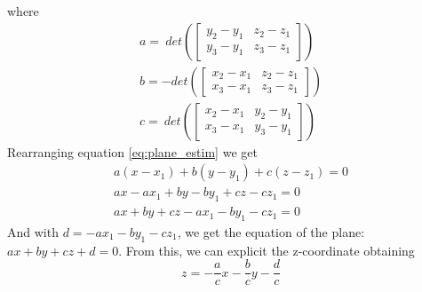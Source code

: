 where
\begin{equation}
    \label{eq:plane_coefficients}
    \begin{gathered}
        a = \ det \left (\begin{bmatrix}
            y_2 - y_1 & z_2 - z_1 \\
            y_3 - y_1 & z_3 - z_1 
        \end{bmatrix} \right ) \\
        b = - det \left (\begin{bmatrix}
            x_2 - x_1 & z_2 - z_1 \\
            x_3 - x_1 & z_3 - z_1
        \end{bmatrix} \right ) \\
        c = \ det \left (\begin{bmatrix}
            x_2 - x_1 & y_2 - y_1 \\
            x_3 - x_1 & y_3 - y_1
        \end{bmatrix} \right )
    \end{gathered}
\end{equation}
Rearranging equation \ref{eq:plane_estim} we get
\begin{equation}
    \begin{gathered}
        a(x - x_1) + b(y - y_1) + c(z - z_1) = 0 \\
        ax - ax_1 + by - by_1 + cz - cz_1 = 0 \\
        ax + by + cz - ax_1 - by_1 - cz_1 = 0
    \end{gathered}
\end{equation}
And with $d = -ax_1 - by_1 - cz_1$, we get the equation of the plane:
$ax + by + cz + d = 0$. From this, we can explicit the z-coordinate obtaining
\begin{equation}
    \label{eq:plane_z_explicit}
    z = -\frac{a}{c} x - \frac{b}{c} y - \frac{d}{c}
\end{equation}

